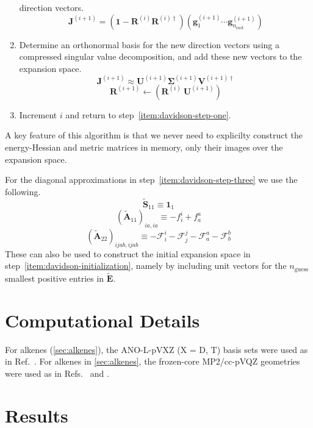 \begin{enumerate}
        direction vectors.
        \[
            \mathbf{J}^{(i+1)}
            =
            (\mathbf{1} - \mathbf{R}^{(i)}\mathbf{R}^{(i)\dagger})
            (\mathbf{g}_1^{(i+1)}\cdots \mathbf{g}_{n_\mathrm{root}}^{(i+1)})
        \]
    \item
        Determine an orthonormal basis for the new direction vectors using a
        compressed singular value decomposition, and add these new vectors to
        the expansion space.
        \[
            \mathbf{J}^{(i+1)}
            \approx
            \mathbf{U}^{(i+1)}
            \boldsymbol\Sigma^{(i+1)}
            \mathbf{V}^{(i+1)\dagger}
        \]
        \[
            \mathbf{R}^{(i+1)}
            \leftarrow
            (\mathbf{R}^{(i)}\ \mathbf{U}^{(i+1)})
        \]
    \item
        Increment \(i\) and return to step~\ref{item:davidson-step-one}.
\end{enumerate}
A key feature of this algorithm is that we never need to explicilty construct
the energy-Hessian and metric matrices in memory, only their images over the
expansion space.

For the diagonal approximations in step~\ref{item:davidson-step-three} we use
the following.
\[
    \tilde{\mathbf{S}}_{11}
    \equiv
    \mathbf{1}_1
\]
\[
    (\tilde{\mathbf{A}}_{11})_{ia,ia}
    \equiv
    -
    f_i^i
    +
    f_a^a
\]
\[
    (\tilde{\mathbf{A}}_{22})_{ijab,ijab}
    \equiv
    -
    \mathcal{F}_i^i
    -
    \mathcal{F}_j^j
    -
    \mathcal{F}_a^a
    -
    \mathcal{F}_b^b
\]
These can also be used to construct the initial expansion space in
step~\ref{item:davidson-initialization}, namely by including unit vectors for
the \(n_\mathrm{guess}\) smallest positive entries in \(\tilde{\mathbf{E}}\).


\section{Computational Details}

For alkenes (\cref{sec:alkenes}), the ANO-L-pVXZ (X = D, T) basis
sets\cite{Widmark:1990p291} were used as in Ref.~.
For alkenes in \cref{sec:alkenes}, the frozen-core MP2/cc-pVQZ geometries were
used as in Refs.~ and .



\section{Results}


